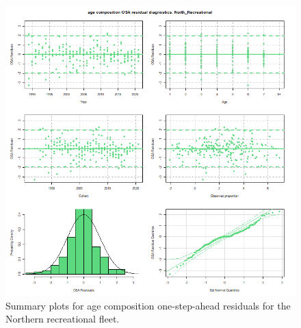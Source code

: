 \documentclass[
]{article}
\begin{document}
\begin{figure}

{\centering \includegraphics[width=1\linewidth]{../2023.RT.Runs/Run34/plots_png/diagnostics/OSA_resid_paa_6panel_North_Recreational} 

}

\caption{Summary plots for age composition one-step-ahead residuals for the Northern recreational fleet.}\label{fig:osa-North-rec-paa-summ}
\end{figure}
\end{document}
